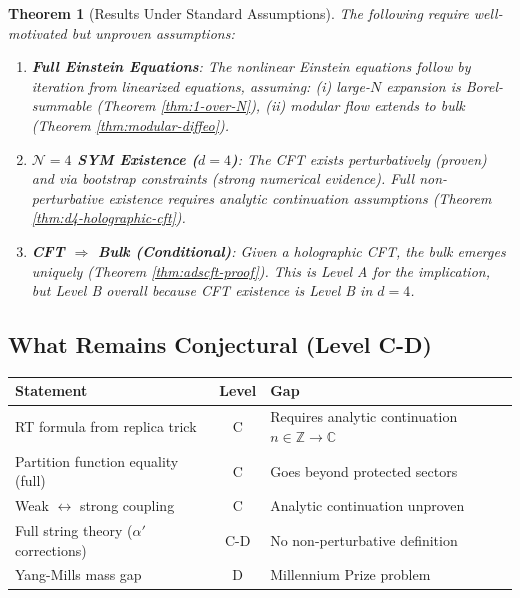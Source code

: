\documentclass[12pt,a4paper]{article}
\newtheorem{theorem}{Theorem}[section]
\begin{document}
\begin{theorem}[Results Under Standard Assumptions]
The following require well-motivated but unproven assumptions:

\begin{enumerate}
    \item \textbf{Full Einstein Equations}: The nonlinear Einstein equations follow by iteration from linearized equations, assuming: (i) large-$N$ expansion is Borel-summable (Theorem \ref{thm:1-over-N}), (ii) modular flow extends to bulk (Theorem \ref{thm:modular-diffeo}).
    
    \item \textbf{$\mathcal{N}=4$ SYM Existence ($d=4$)}: The CFT exists perturbatively (proven) and via bootstrap constraints (strong numerical evidence). Full non-perturbative existence requires analytic continuation assumptions (Theorem \ref{thm:d4-holographic-cft}).
    
    \item \textbf{CFT $\Rightarrow$ Bulk (Conditional)}: Given a holographic CFT, the bulk emerges uniquely (Theorem \ref{thm:adscft-proof}). This is Level A for the implication, but Level B overall because CFT existence is Level B in $d=4$.
\end{enumerate}
\end{theorem}

\subsection{What Remains Conjectural (Level C-D)}

\begin{center}
\begin{tabular}{|p{6cm}|c|p{7cm}|}
\hline
\textbf{Statement} & \textbf{Level} & \textbf{Gap} \\
\hline
RT formula from replica trick & C & Requires analytic continuation $n \in \mathbb{Z} \to \mathbb{C}$ \\
Partition function equality (full) & C & Goes beyond protected sectors \\
Weak $\leftrightarrow$ strong coupling & C & Analytic continuation unproven \\
Full string theory ($\alpha'$ corrections) & C-D & No non-perturbative definition \\
Yang-Mills mass gap & D & Millennium Prize problem \\
\hline
\end{tabular}
\end{center}
\end{document}
